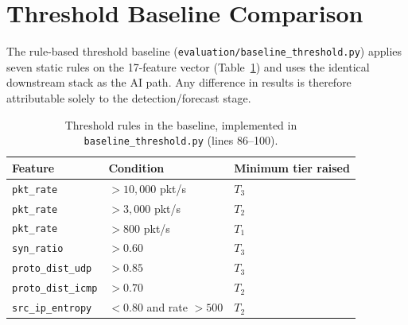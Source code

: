 \section{Threshold Baseline Comparison}
\label{sec:baseline}

The rule-based threshold baseline
(\texttt{evaluation/baseline\_threshold.py}) applies seven static rules
on the 17-feature vector (Table~\ref{tab:baseline-rules}) and uses the
identical downstream stack as the AI path. Any difference in results is
therefore attributable solely to the detection/forecast stage.

\begin{table}[H]
\centering
\small
\caption{Threshold rules in the baseline, implemented in
\texttt{baseline\_threshold.py} (lines 86--100).}
\label{tab:baseline-rules}
\begin{tabular}{@{}lll@{}}
\toprule
Feature & Condition & Minimum tier raised \\
\midrule
\texttt{pkt\_rate}         & $> 10{,}000$ pkt/s & $T_3$ \\
\texttt{pkt\_rate}         & $> 3{,}000$ pkt/s  & $T_2$ \\
\texttt{pkt\_rate}         & $> 800$ pkt/s      & $T_1$ \\
\texttt{syn\_ratio}        & $> 0.60$            & $T_3$ \\
\texttt{proto\_dist\_udp}  & $> 0.85$            & $T_3$ \\
\texttt{proto\_dist\_icmp} & $> 0.70$            & $T_2$ \\
\texttt{src\_ip\_entropy}  & $< 0.80$ and rate $> 500$ & $T_2$ \\
\bottomrule
\end{tabular}
\end{table}

